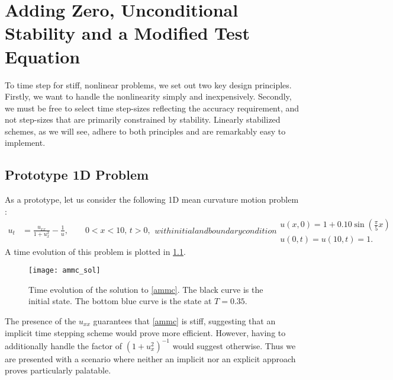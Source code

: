 \chapter{Adding Zero, Unconditional Stability and a Modified Test Equation}
To time step for stiff, nonlinear problems, we set out two key design principles. Firstly, we want to handle the nonlinearity simply and inexpensively. Secondly, we must be free to select time step-sizes reflecting the accuracy requirement, and not step-sizes that are primarily constrained by stability. Linearly stabilized schemes, as we will see, adhere to both principles and are remarkably easy to implement.

\section{Prototype 1D Problem}
As a prototype, let us consider the following 1D mean curvature motion problem \cite{duchemin2014explicit}: 
\begin{subequations} 
\begin{align}
u_t &= \frac{u_{xx}}{1 + u_x^2} - \frac{1}{u}, 
\qquad 0 < x < 10, \, t > 0,
\label{ammc 1}
\end{align}
with initial and boundary condition
\begin{gather}
u(x,0) = 1 + 0.10\sin\left( \frac{\pi}{5}x \right) 
\\
u(0,t)=u(10,t)=1.
\end{gather}
\label{ammc}
\end{subequations}
A time evolution of this problem is plotted in \cref{fig:ammc sol}.
\begin{figure}[htb!]
        \centering
\texttt{[image: ammc\_sol]}
\caption[Time evolution of the solution to \cref{ammc}.]{Time evolution of the solution to \cref{ammc}. The black curve is the initial state. The bottom blue curve is the state at $T=0.35$.}
\label{fig:ammc sol}
\end{figure}

The presence of the $u_{xx}$ guarantees that \eqref{ammc} is stiff, suggesting that an implicit time stepping scheme would prove more efficient. However, having to additionally handle the factor of $(1+u_x^2)^{-1}$ would suggest otherwise. Thus we are presented with a scenario where neither an implicit nor an explicit approach proves particularly palatable.

